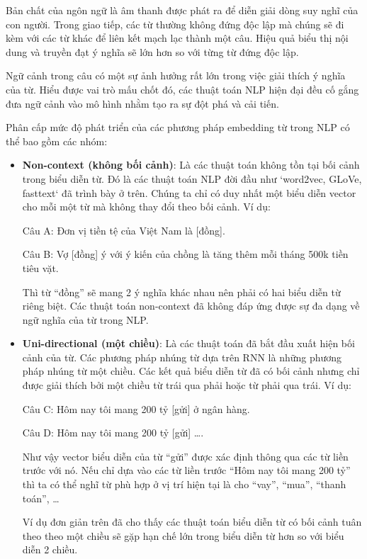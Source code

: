 Bản chất của ngôn ngữ là âm thanh được phát ra để diễn giải dòng suy nghĩ của con người. Trong giao tiếp, các từ thường không đứng độc lập mà chúng sẽ đi kèm với các từ khác để liên kết mạch lạc thành một câu. Hiệu quả biểu thị nội dung và truyền đạt ý nghĩa sẽ lớn hơn so với từng từ đứng độc lập.

Ngữ cảnh trong câu có một sự ảnh hưởng rất lớn trong việc giải thích ý nghĩa của từ. Hiểu được vai trò mấu chốt đó, các thuật toán NLP hiện đại đều cố gắng đưa ngữ cảnh vào mô hình nhằm tạo ra sự đột phá và cải tiến.

Phân cấp mức độ phát triển của các phương pháp embedding từ trong NLP có thể bao gồm các nhóm:
\begin{itemize}
    \item \textbf{Non-context (không bối cảnh)}: Là các thuật toán không tồn tại bối cảnh trong biểu diễn từ. Đó là các thuật toán NLP đời đầu như `word2vec, GLoVe, fasttext` đã trình bày ở trên. Chúng ta chỉ có duy nhất một biểu diễn vector cho mỗi một từ mà không thay đổi theo bối cảnh. Ví dụ:

    Câu A: Đơn vị tiền tệ của Việt Nam là [đồng].
    
    Câu B: Vợ [đồng] ý với ý kiến của chồng là tăng thêm mỗi tháng 500k tiền tiêu vặt.
    
    Thì từ ``đồng'' sẽ mang 2 ý nghĩa khác nhau nên phải có hai biểu diễn từ riêng biệt. Các thuật toán non-context đã không đáp ứng được sự đa dạng về ngữ nghĩa của từ trong NLP.

    \item \textbf{Uni-directional (một chiều)}: Là các thuật toán đã bắt đầu xuất hiện bối cảnh của từ. Các phương pháp nhúng từ dựa trên RNN là những phương pháp nhúng từ một chiều. Các kết quả biểu diễn từ đã có bối cảnh nhưng chỉ được giải thích bởi một chiều từ trái qua phải hoặc từ phải qua trái. Ví dụ:

    Câu C: Hôm nay tôi mang 200 tỷ [gửi] ở ngân hàng.

    Câu D: Hôm nay tôi mang 200 tỷ [gửi] \dots.

    Như vậy vector biểu diễn của từ ``gửi'' được xác định thông qua các từ liền trước với nó. Nếu chỉ dựa vào các từ liền trước ``Hôm nay tôi mang 200 tỷ'' thì ta có thể nghĩ từ phù hợp ở vị trí hiện tại là cho ``vay'', ``mua'', ``thanh toán'', \dots

    Ví dụ đơn giản trên đã cho thấy các thuật toán biểu diễn từ có bối cảnh tuân theo theo một chiều sẽ gặp hạn chế lớn trong biểu diễn từ hơn so với biểu diễn 2 chiều.


\end{itemize}

